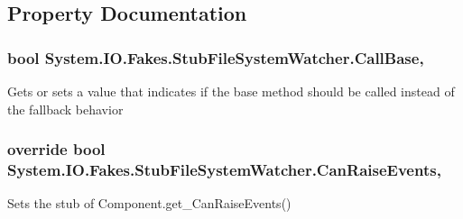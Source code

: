 \subsection{Property Documentation}
\hypertarget{class_system_1_1_i_o_1_1_fakes_1_1_stub_file_system_watcher_a5c5900d337108fee25505aa0b658b06c}{
\subsubsection[{Call\-Base}]{\setlength{\rightskip}{0pt plus 5cm}bool System.\-I\-O.\-Fakes.\-Stub\-File\-System\-Watcher.\-Call\-Base\hspace{0.3cm}{\ttfamily [get]}, {\ttfamily [set]}}}\label{class_system_1_1_i_o_1_1_fakes_1_1_stub_file_system_watcher_a5c5900d337108fee25505aa0b658b06c}


Gets or sets a value that indicates if the base method should be called instead of the fallback behavior

\hypertarget{class_system_1_1_i_o_1_1_fakes_1_1_stub_file_system_watcher_a1315c288080ce372c7c609539884022b}{
\subsubsection[{Can\-Raise\-Events}]{\setlength{\rightskip}{0pt plus 5cm}override bool System.\-I\-O.\-Fakes.\-Stub\-File\-System\-Watcher.\-Can\-Raise\-Events\hspace{0.3cm}{\ttfamily [get]}, {\ttfamily [protected]}}}\label{class_system_1_1_i_o_1_1_fakes_1_1_stub_file_system_watcher_a1315c288080ce372c7c609539884022b}


Sets the stub of Component.\-get\-\_\-\-Can\-Raise\-Events()

